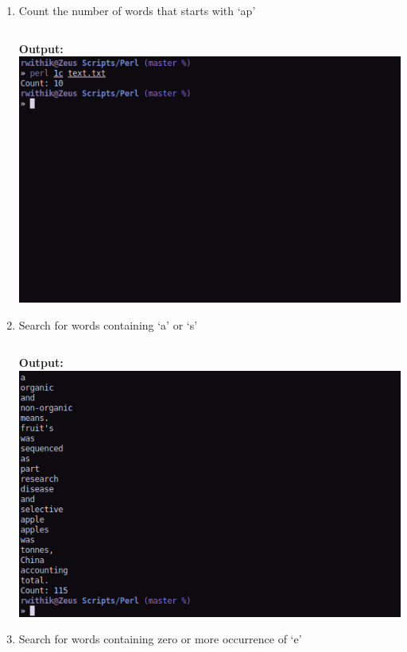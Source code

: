 \documentclass[10pt,a4paper,titlepage]{report}
\begin{document}
\begin{enumerate}
	\item Count the number of words that starts with `ap’
	\par
	\newline
	\inputminted[tabsize=4]{perl}{../Scripts/Perl/1c}
	\pagebreak
	\textbf{Output: }\newline
	\includegraphics[width=\linewidth]{../Images/Perl/1c.png}
	\item Search for words containing `a’ or `s’
	\par
	\newline
	\inputminted[tabsize=4]{perl}{../Scripts/Perl/1d}
	\pagebreak
	\textbf{Output: }\newline
	\includegraphics[width=\linewidth]{../Images/Perl/1d.png}
	\item Search for words containing zero or more occurrence of `e’
	\par
	\newline

\end{enumerate}
\end{document}
